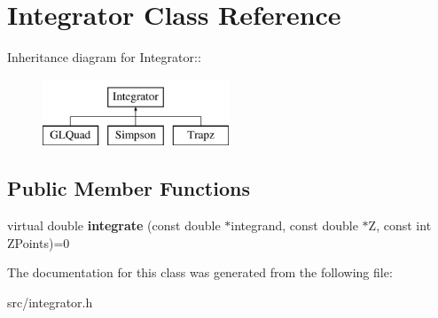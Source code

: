 \hypertarget{classIntegrator}{
\section{Integrator Class Reference}
\label{da/d05/classIntegrator}
}
Inheritance diagram for Integrator::\begin{figure}[H]
\begin{center}
\leavevmode
\includegraphics[height=2cm]{da/d05/classIntegrator}
\end{center}
\end{figure}
\subsection*{Public Member Functions}
\begin{DoxyCompactItemize}
\item 
\hypertarget{classIntegrator_a89fbef2f7923ce4e2c979b2ff1d1f4ac}{
virtual double {\bfseries integrate} (const double $\ast$integrand, const double $\ast$Z, const int ZPoints)=0}
\label{da/d05/classIntegrator_a89fbef2f7923ce4e2c979b2ff1d1f4ac}

\end{DoxyCompactItemize}


The documentation for this class was generated from the following file:\begin{DoxyCompactItemize}
\item 
src/integrator.h\end{DoxyCompactItemize}
